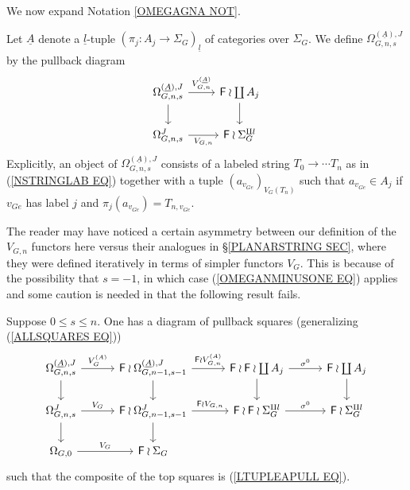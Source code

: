 \documentclass[a4paper,10pt]{article}%
\begin{document}
We now expand Notation \ref{OMEGAGNA NOT}.

\begin{notation}
	Let $\underline{A}$ denote a $\underline{l}$-tuple 
	$(\pi_j \colon A_j \to \Sigma_G)_{\underline{l}}$ of categories over $\Sigma_G$. We define $\Omega_{G,n,s}^{(\underline{A}),J}$ by the pullback diagram
\begin{equation}\label{LTUPLEAPULL EQ}
\begin{tikzcd}
	\Omega_{G,n,s}^{(\underline{A}),J} \ar{r}{V_{G,n}^{(\underline{A})}} \ar{d}& 
	\Fin \wr \coprod A_j \ar{d}
\\
	\Omega_{G,n,s}^{J} \ar{r}[swap]{V_{G,n}} & 
	\Fin \wr \Sigma_G^{\amalg l} 
\end{tikzcd}
\end{equation}
Explicitly, an object of $\Omega_{G,n,s}^{(\underline{A}),J}$ consists of a labeled string $T_0 \to \cdots T_n$ as in (\ref{NSTRINGLAB EQ})
together with 
a tuple $(a_{v_{Ge}})_{V_G(T_n)}$ such that
$a_{v_{Ge}} \in A_j$ if $v_{Ge}$ has label $j$ and 
$\pi_j (a_{v_{Ge}}) = T_{n,v_{Ge}}$.
\end{notation}


The reader may have noticed a certain asymmetry between our definition of the $V_{G,n}$ functors here versus their analogues in \S \ref{PLANARSTRING SEC}, where they were defined iteratively in terms of simpler functors $V_G$. This is because of the possibility that $s=-1$, in which case (\ref{OMEGANMINUSONE EQ}) applies and some caution is needed in that the following result fails.


\begin{proposition}\label{ALLSQUARESJ PROP}
Suppose $0\leq s \leq n$. One has a diagram of pullback squares
(generalizing (\ref{ALLSQUARES EQ}))
\begin{equation}\label{ALLSQUARESJ EQ}
\begin{tikzcd}[column sep = 3em]
	\Omega^{(\underline{A}),J}_{G,n,s} \ar{r}{V_G^{(A)}} \ar{d}& 
	\Fin \wr \Omega^{(\underline{A}),J}_{G,n-1,s-1} \ar{r}{\Fin \wr V_{G,n}^{(A)}} \ar{d}&
	\Fin \wr \Fin \wr \coprod A_j  \ar{d} \ar{r}{\sigma^0} &
	\Fin \wr \coprod A_j \ar{d}
\\
	\Omega_{G,n,s}^J \ar{r}{V_G} \ar{d} &
	\Fin \wr \Omega_{G,n-1,s-1}^J \ar{r}{\Fin \wr V_{G,n}} \ar{d} &
	\Fin \wr \Fin \wr \Sigma_G^{\amalg l} \ar{r}{\sigma^0} &
	\Fin \wr \Sigma_G^{\amalg l}
\\
	\Omega_{G,0} \ar{r}{V_G} &
	\Fin \wr \Sigma_G
\end{tikzcd}
\end{equation}
such that the composite of the top squares is (\ref{LTUPLEAPULL EQ}).
\end{proposition}
\end{document}
